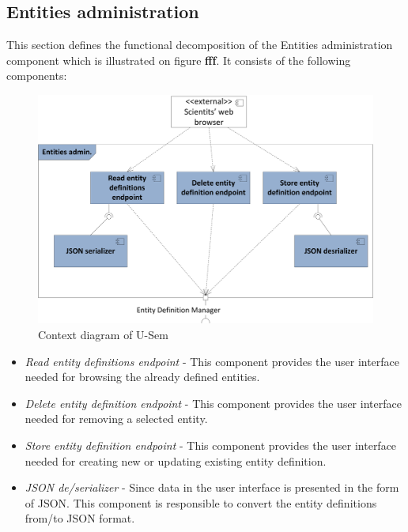 \documentclass[a4paper, notitlepage]{article}
\begin{document}
\subsection{Entities administration}
This section defines the functional decomposition of the Entities administration component which is illustrated on figure \textbf{fff}. It consists of the following components:

\begin{figure}[h!]
  \centering
  	\includegraphics[scale=0.6]{functional/func_admin.png}
  \caption{Context diagram of U-Sem }
  \label{fig_context}
\end{figure}

\begin{itemize}
	\item \textit{Read entity definitions endpoint} - This component provides the user interface needed for browsing the already defined entities.
	
	\item \textit{Delete entity definition endpoint} - This component provides the user interface needed for removing a selected entity.
	 
	\item \textit{Store entity definition endpoint} - This component provides the user interface needed for creating new or updating existing entity definition.
	
	\item \textit{JSON de/serializer} - Since data in the user interface is presented in the form of JSON. This component is responsible to convert the entity definitions from/to JSON format.
	
\end{itemize}
\end{document}
